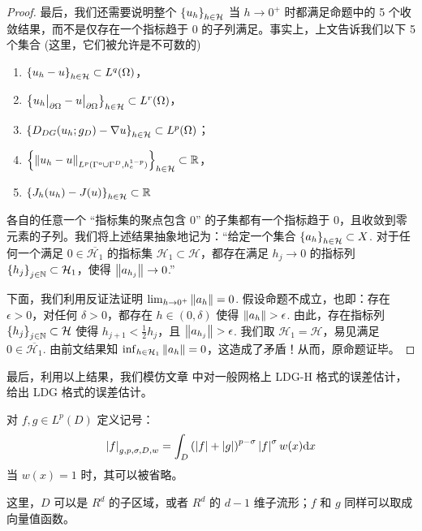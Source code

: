 \begin{theorem}
\begin{proof}
		最后，我们还需要说明整个 \(\left\{u_{h}\right\}_{h \in \mathcal{H}}\) 当 \(h \to 0^{+}\) 时都满足命题中的 5 个收敛结果，而不是仅存在一个指标趋于 \(0\) 的子列满足。事实上，上文告诉我们以下 5 个集合 (这里，它们被允许是不可数的)
		\begin{enumerate}
			\item \(\left\{u_{h} - u\right\}_{h \in \mathcal{H}} \subset L^{q}(\Omega)\)，
			\item \(\left\{u_{h}\big|_{\partial\Omega} - u\big|_{\partial\Omega}\right\}_{h \in \mathcal{H}} \subset L^{r}(\Omega)\)，
			\item \(\left\{D_{DG}(u_{h}; g_{D}) - \nabla u\right\}_{h \in \mathcal{H}} \subset L^{p}(\Omega)\)；
			\item \(\left\{\left\lVert u_{h} - u\right\rVert_{L^{p}(\Gamma^{o} \cup \Gamma^{D}, h_{e}^{1-p})}\right\}_{h \in \mathcal{H}} \subset \mathbb{R}\)，
			\item \(\left\{J_{h}(u_{h}) - J(u)\right\}_{h \in \mathcal{H}} \subset \mathbb{R}\)
		\end{enumerate}
		各自的任意一个 “指标集的聚点包含 \(0\)” 的子集都有一个指标趋于 \(0\)，且收敛到零元素的子列。我们将上述结果抽象地记为：“给定一个集合 \(\left\{a_{h}\right\}_{h \in \mathcal{H}} \subset X\). 对于任何一个满足 \(0 \in \overline{\mathcal{H}_{1}}\) 的指标集 \(\mathcal{H}_{1} \subset \mathcal{H}\)，都存在满足 \(h_{j} \to 0\) 的指标列 \(\left\{h_{j}\right\}_{j \in \mathbb{N}} \subset \mathcal{H}_{1}\)，使得 \(\left\lVert a_{h_{j}}\right\rVert \to 0\).”

		下面，我们利用反证法证明 \(\lim_{h \to 0^{+}} \left\lVert a_{h}\right\rVert = 0\). 假设命题不成立，也即：存在 \(\epsilon > 0\)，对任何 \(\delta > 0\)，都存在 \(h \in (0, \delta)\) 使得 \(\left\lVert a_{h}\right\rVert > \epsilon\). 由此，存在指标列 \(\left\{h_{j}\right\}_{j \in \mathbb{N}} \subset \mathcal{H}\) 使得 \(h_{j+1} < \frac{1}{2} h_{j}\)，且 \(\left\lVert a_{h_{j}}\right\rVert > \epsilon\). 我们取 \(\mathcal{H}_{1} = \mathcal{H}\)，易见满足 \(0 \in \overline{\mathcal{H}_{1}}\). 由前文结果知 \(\inf_{h \in \mathcal{H}_{1}} \left\lVert a_{h}\right\rVert = 0\)，这造成了矛盾！从而，原命题证毕。
	\end{proof}
\end{theorem}


最后，利用以上结果，我们模仿文章 \cite{10.1007/s10915-019-00967-6} 中对一般网格上 LDG-H 格式的误差估计，给出 LDG 格式的误差估计。

\begin{definition}[\cite{10.1090/S0025-5718-1993-1192966-4}]
	对 \(f, g \in L^{p}(D)\) 定义记号：
	\begin{equation}
		\left\lvert f\right\rvert_{g, p, \sigma, D, w} 
		= \int_{D} \left(\left\lvert f\right\rvert + \left\lvert g\right\rvert\right)^{p-\sigma} \left\lvert f\right\rvert^{\sigma} w(x) \mathrm{d} x
	\end{equation}
	当 \(w(x) = 1\) 时，其可以被省略。

	这里，\(D\) 可以是 \(R^{d}\) 的子区域，或者 \(R^{d}\) 的 \(d-1\) 维子流形；\(f\) 和 \(g\) 同样可以取成向量值函数。
\end{definition}


